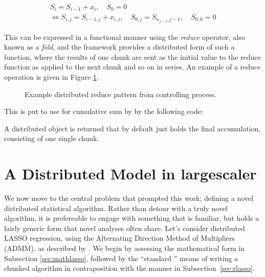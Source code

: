\documentclass[letterpaper, inpress]{jds} %
\begin{document}
\begin{equation}
\begin{gathered}\label{eqn:cumsum}
    S_i = S_{i-1}+x_i, \quad S_0 = 0\\
    \iff S_{i,j} = S_{i-1,j} + x_{i,j}, \quad S_{0,j} = S_{n_{j-1},j-1}, \quad S_{0,0} = 0
\end{gathered}
\end{equation}

This can be expressed in a functional manner using the \textit{reduce} operator, also known as a \textit{fold}, and the  framework provides a distributed form of such a function, where the results of one chunk are sent as the initial value to the reduce function as applied to the next chunk and so on in series.
An example of a reduce operation is given in Figure \ref{fig:dreduce}.

\begin{figure}[ht]
\begin{center}
    
\caption{Example distributed reduce pattern from controlling process.}
\label{fig:dreduce}
\end{center}
\end{figure}

This is put to use for cumulative sum by  by the following code:


A distributed object is returned that by default just holds the final accumulation, consisting of one single chunk.

\section{A Distributed Model in largescaler}\label{sec:lsm}

We now move to the central problem that prompted this work; defining a novel distributed statistical algorithm.
Rather than detour with a truly novel algorithm, it is prefereable to engage with something that is familiar, but holds a fairly generic form that novel analyses often share.
Let's consider distributed LASSO regression, using the Alternating Direction Method of Multipliers (ADMM), as described by \citet{mateos2010}.
We begin by assessing the mathematical form in Subsection \ref{sec:mathlasso}, followed by the ``standard '' means of writing a chunked algorithm in contraposition with the  manner in Subsection~\ref{sec:rlasso}.
\end{document}
